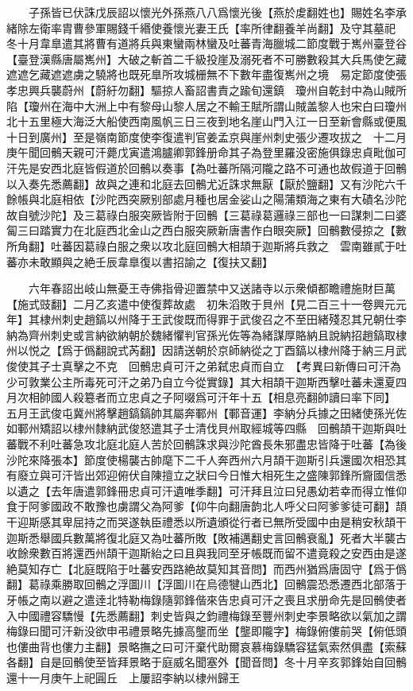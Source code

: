 　　子孫皆已伏誅戊辰詔以懷光外孫燕八八爲懷光後【燕於䖍翻姓也】賜姓名李承緒除左衛率胄曹參軍賜錢千緡使養懷光妻王氏【率所律翻養羊尚翻】及守其墓祀　冬十月韋臯遣其將曹有道將兵與東蠻兩林蠻及吐蕃青海臘城二節度戰于嶲州臺登谷【臺登漢縣唐屬嶲州】大破之斬首二千級投崖及溺死者不可勝數殺其大兵馬使乞藏遮遮乞藏遮遮虜之驍將也既死臯所攻城栅無不下數年盡復嶲州之境　易定節度使張孝忠興兵襲蔚州【蔚紆勿翻】驅掠人畜詔書責之踰旬還鎮　瓊州自乾封中為山賊所陷【瓊州在海中大洲上中有黎母山黎人居之不輸王賦所謂山賊盖黎人也宋白曰瓊州北十五里極大海泛大船使西南風帆三日三夜到地名崖山門入江一日至新會縣或便風十日到廣州】至是嶺南節度使李復遣判官姜孟京與崖州刺史張少遷攻拔之　十二月庚午聞回鶻天親可汗薨戊寅遣鴻臚卿郭鋒册命其子為登里羅没密施俱錄忠貞毗伽可汗先是安西北庭皆假道於回鶻以奏事【為吐蕃所隔河隴之路不可通也故假道于回鶻以入奏先悉薦翻】故與之連和北庭去回鶻尤近誅求無厭【厭於鹽翻】又有沙陀六千餘帳與北庭相依【沙陀西突厥别部處月種也居金娑山之陽蒲類海之東有大磧名沙陀故自號沙陀】及三葛祿白服突厥皆附于回鶻【三葛祿葛邏祿三部也一曰謀刺二曰婆匐三曰踏實力在北庭西北金山之西白服突厥新唐書作白眼突厥】回鶻數侵掠之【數所角翻】吐蕃因葛祿白服之衆以攻北庭回鶻大相頡于迦斯將兵救之　雲南雖貳于吐蕃亦未敢顯與之絶壬辰韋臯復以書招諭之【復扶又翻】

　　六年春詔出岐山無憂王寺佛指骨迎置禁中又送諸寺以示衆傾都瞻禮施財巨萬【施式豉翻】二月乙亥遣中使復葬故處　初朱滔敗于貝州【見二百三十一卷興元元年】其棣州刺史趙鎬以州降于王武俊既而得罪于武俊召之不至田緒殘忍其兄朝仕李納為齊州刺史或言納欲納朝於魏緒懼判官孫光佐等為緒謀厚賂納且說納招趙鎬取棣州以悦之【爲于僞翻說式芮翻】因請送朝於京師納從之丁酉鎬以棣州降于納三月武俊使其子士真擊之不克　回鶻忠貞可汗之弟弑忠貞而自立　【考異曰新傳曰可汗為少可敦業公主所毒死可汗之弟乃自立今從實錄】其大相頡干迦斯西擊吐蕃未還夏四月次相帥國人殺簒者而立忠貞之子阿啜爲可汗年十五【相息亮翻帥讀曰率下同】　五月王武俊屯冀州將擊趙鎬鎬帥其屬奔鄆州【鄆音運】李納分兵據之田緒使孫光佐如鄆州矯詔以棣州隸納武俊怒遣其子士清伐貝州取經城等四縣　回鶻頡干迦斯與吐蕃戰不利吐蕃急攻北庭北庭人苦於回鶻誅求與沙陀酋長朱邪盡忠皆降于吐蕃【為後沙陀來降張本】節度使楊襲古帥麾下二千人奔西州六月頡干迦斯引兵還國次相恐其有廢立與可汗皆出郊迎俯伏自陳擅立之狀曰今日惟大相死生之盛陳郭鋒所齎國信悉以遺之【去年唐遣郭鋒冊忠貞可汗遺唯季翻】可汗拜且泣曰兒愚幼若幸而得立惟仰食于阿爹國政不敢豫也虜謂父為阿爹【仰牛向翻唐韵北人呼父曰阿爹爹徒可翻】頡干迎斯感其卑屈持之而哭遂執臣禮悉以所遺頒從行者已無所受國中由是稍安秋頡干迦斯悉舉國兵數萬將復北庭又為吐蕃所敗【敗補邁翻史言回鶻衰亂】死者大半襲古收餘衆數百將還西州頡干迦斯紿之曰且與我同至牙帳既而留不遣竟殺之安西由是遂絶莫知存亡【北庭既陷于吐蕃安西路絶故莫知其音問】而西州猶爲唐固守【爲于僞翻】葛祿乘勝取回鶻之浮圖川【浮圖川在烏德犍山西北】回鶻震恐悉遷西北部落于牙帳之南以避之遣逹北特勒梅錄隨郭鋒偕來告忠貞可汗之喪且求册命先是回鶻使者入中國禮容驕慢【先悉薦翻】刺史皆與之鈞禮梅錄至豐州刺史李景略欲以氣加之謂梅錄曰聞可汗新没欲申弔禮景略先據高壟而坐【壟即隴字】梅錄俯僂前哭【俯低頭也僂曲背也僂力主翻】景略撫之曰可汗棄代助爾哀慕梅錄驕容猛氣索然俱盡【索蘇各翻】自是回鶻使至皆拜景略于庭威名聞塞外【聞音問】冬十月辛亥郭鋒始自回鶻還十一月庚午上祀圓丘　上屢詔李納以棣州歸王

